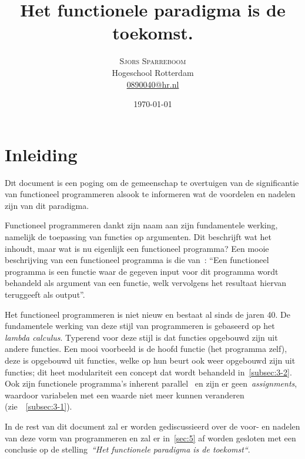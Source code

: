 \documentclass[twoside,twocolumn]{article}
\title{Het functionele paradigma is de toekomst.} %
\author{%
  \textsc{Sjors Sparreboom} \\[1ex] %
\normalsize Hogeschool Rotterdam \\ %
\normalsize \href{mailto:0890040@hr.nl}{0890040@hr.nl} \\[2ex] %
}
\date{\today} %
\begin{document}
\nocite{*}

\maketitle


\section{Inleiding}
\label{sec:1}
\lettrine[nindent=0em,lines=3]{D}it document is een poging om de gemeenschap te
overtuigen van de significantie van functioneel programmeren alsook te
informeren wat de voordelen en nadelen zijn van dit paradigma.

Functioneel programmeren dankt zijn naam aan zijn fundamentele werking,
namelijk de toepassing van functies op argumenten. Dit beschrijft wat
het inhoudt, maar wat is nu eigenlijk een functioneel programma? Een
mooie beschrijving van een functioneel programma is die van~\textcite{src1}:
\enquote{Een functioneel programma is een functie waar de gegeven input voor
dit programma wordt behandeld als argument van een functie, welk vervolgens het
resultaat hiervan teruggeeft als output}.

Het functioneel programmeren is niet nieuw en bestaat al sinds de jaren 40. De
fundamentele werking van deze stijl van programmeren is gebaseerd op
het \textit{lambda calculus}\cite{src2,src3}. Typerend voor deze stijl is dat
functies opgebouwd zijn uit andere functies. Een mooi voorbeeld is de hoofd
functie (het programma zelf), deze is opgebouwd uit functies, welke op hun
beurt ook weer opgebouwd zijn uit functies; dit heet modulariteit een concept
dat wordt behandeld in~\cref{subsec:3-2}. Ook zijn functionele programma's
inherent parallel~\cite{src4,src12} en zijn er geen~\textit{assignments},
waardoor variabelen met een waarde niet meer kunnen veranderen
(zie~~\cref{subsec:3-1}).

In de rest van dit document zal er worden gediscussieerd over de voor- en
nadelen van deze vorm van programmeren en zal er in~\cref{sec:5} af worden
gesloten met een conclusie op de stelling~\textit{``Het functionele paradigma
is de toekomst``}.

\end{document}

